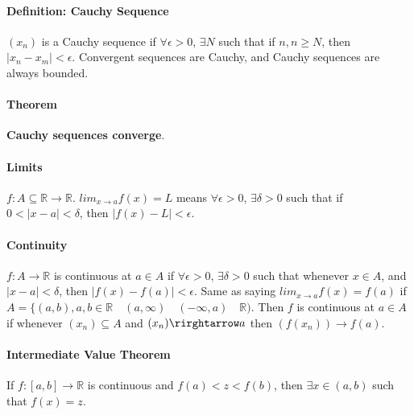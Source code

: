 \documentclass[10pt,letter]{article}
\begin{document}
\paragraph*{Definition: Cauchy Sequence}
$(x_n)$ is a Cauchy sequence if $\forall\epsilon>0$, $\exists N$ such that if $n,n\geq N$, then $|x_n-x_m|<\epsilon$. Convergent sequences are Cauchy, and Cauchy sequences are always bounded. 
\paragraph*{Theorem}
\textbf{Cauchy sequences converge}. 

\paragraph*{Limits}
$f:A\subseteq\mathbb{R}\rightarrow\mathbb{R}$. $lim_{x\rightarrow a}f(x)=L$ means $\forall\epsilon>0$, $\exists\delta>0$ such that if $0<|x-a|<\delta$, then $|f(x)-L|<\epsilon$. 

\paragraph*{Continuity}
$f:A\rightarrow\mathbb{R}$ is continuous at $a\in A$ if $\forall\epsilon>0$, $\exists\delta>0$ such that whenever $x\in A$, and $|x-a|<\delta$, then $|f(x)-f(a)|<\epsilon$. Same as saying $lim_{x\rightarrow a}f(x) = f(a)$ if $A=\{(a,b), a,b\in\mathbb{R} \quad (a,\infty)\quad  (-\infty,a)\quad \mathbb{R})$. Then $f$ is continuous at $a\in A$ if whenever $(x_n)\subseteq A$  and $(x_n)\rirghtarrow a$ then $(f(x_n))\rightarrow f(a)$. 

\paragraph*{Intermediate Value Theorem}
If $f:[a,b]\rightarrow\mathbb{R}$ is continuous and $f(a)<z<f(b)$, then $\exists x\in(a,b)$ such that $f(x)=z$. 
\end{document}
